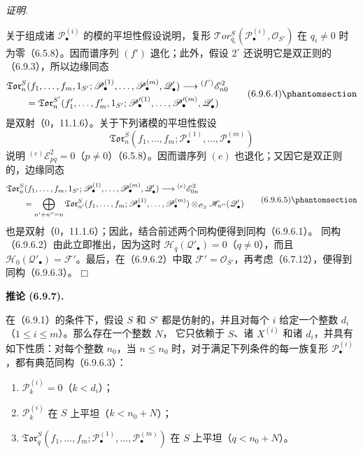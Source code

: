 \documentclass[UTF8,fontset=none,11pt,oneside,openany]{ctexbook}
\providecommand{\square}{\mdlgwhtsquare}
\newenvironment{corollary}[1][]{%
  \par\medskip\noindent\textbf{推论 (#1).}\ %
}{\par}
\newenvironment{proof}{%
  \par\smallskip\noindent\textit{证明.}\ %
}{\hfill$\square$\par}
\let\EGAOriginalLabel\label
\renewcommand{\label}[1]{\phantomsection\EGAOriginalLabel{#1}}
\begin{document}
\begin{proof}
关于组成诸 $\mathscr P_\bullet^{(i)}$ 的模的平坦性假设说明，复形
$\mathscr{T}\!or_{q_i}^S(\mathscr P_\bullet^{(i)},\mathscr O_{S'})$ 在
$q_i\ne0$ 时为零（6.5.8）。因而谱序列 $(f')$ 退化；此外，假设
$2^\circ$ 还说明它是双正则的（6.9.3），所以边缘同态
\[
\begin{split}
  &\mathfrak{Tor}_n^S
  (f_1,\ldots,f_m,1_{S'};
   \mathscr P_\bullet^{(1)},\ldots,
   \mathscr P_\bullet^{(m)},\mathscr Q'_\bullet)
  \longrightarrow {}^{(f')}\mathscr E_{n0}^2\\
  &\qquad=
  \mathfrak{Tor}_n^{S'}
  (f'_1,\ldots,f'_m,1_{S'};
   \mathscr P_\bullet'^{(1)},\ldots,
   \mathscr P_\bullet'^{(m)},\mathscr Q'_\bullet)
\end{split}
\tag{6.9.6.4}\label{III.6.9.6.4.fr}
\]
是双射（0，11.1.6）。关于下列诸模的平坦性假设
\[
  \mathfrak{Tor}_n^S
  (f_1,\ldots,f_m;
   \mathscr P_\bullet^{(1)},\ldots,\mathscr P_\bullet^{(m)})
\]
说明 ${}^{(e)}\mathscr E_{pq}^2=0$（$p\ne0$）（6.5.8）。因而谱序列
$(e)$ 也退化；又因它是双正则的，边缘同态
\[
\begin{split}
  &\mathfrak{Tor}_n^S
  (f_1,\ldots,f_m,1_{S'};
   \mathscr P_\bullet^{(1)},\ldots,
   \mathscr P_\bullet^{(m)},\mathscr Q'_\bullet)
  \longrightarrow {}^{(e)}\mathscr E_{0n}^2\\
  &\qquad=
  \bigoplus_{n'+n''=n}
  \mathfrak{Tor}_{n'}^S
  (f_1,\ldots,f_m;
   \mathscr P_\bullet^{(1)},\ldots,
   \mathscr P_\bullet^{(m)})
  \otimes_{\mathscr O_S}\mathscr H_{n''}(\mathscr Q'_\bullet)
\end{split}
\tag{6.9.6.5}\label{III.6.9.6.5.fr}
\]
也是双射（0，11.1.6）；因此，结合前述两个同构便得到同构（6.9.6.1）。
同构（6.9.6.2）由此立即推出，因为这时
$\mathscr H_q(\mathscr Q'_\bullet)=0$（$q\ne0$），而且
$\mathscr H_0(\mathscr Q'_\bullet)=\mathscr F'$。最后，在（6.9.6.2）中取
$\mathscr F'=\mathscr O_{S'}$，再考虑（6.7.12），便得到同构（6.9.6.3）。
\end{proof}

\begin{corollary}[6.9.7]
在（6.9.1）的条件下，假设 $S$ 和 $S'$ 都是仿射的，并且对每个
$i$ 给定一个整数 $d_i$（$1\leq i\leq m$）。那么存在一个整数 $N$，
它只依赖于 $S$、诸 $X^{(i)}$ 和诸 $d_i$，并具有如下性质：对每个整数
$n_0$，当 $n\leq n_0$ 时，对于满足下列条件的每一族复形
$\mathscr P_\bullet^{(i)}$，都有典范同构（6.9.6.3）：
\begin{enumerate}
  \item[$1^\circ$] $\mathscr P_k^{(i)}=0$（$k<d_i$）；
  \item[$2^\circ$] $\mathscr P_k^{(i)}$ 在 $S$ 上平坦（$k<n_0+N$）；
  \item[$3^\circ$]
  $\mathfrak{Tor}_q^S(f_1,\ldots,f_m;
  \mathscr P_\bullet^{(1)},\ldots,\mathscr P_\bullet^{(m)})$ 在
  $S$ 上平坦（$q<n_0+N$）。
\end{enumerate}
\end{corollary}
\end{document}
